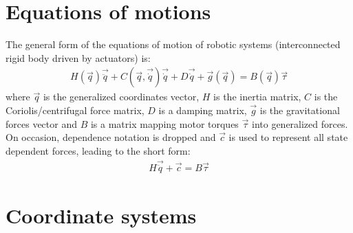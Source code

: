 \section{Equations of motions}
\label{sec:eom}

The general form of the equations of motion of robotic systems (interconnected rigid body driven by actuators) is:
%
\begin{align}
H(\vec{q}) \vec{\ddot{q}} + C(\vec{q},\vec{\dot{q}}) \vec{\dot{q}} + D \vec{\dot{q}} + \vec{g}(\vec{q}) = B(\vec{q}) \vec{\tau} 
\label{eq:manipulator}
\end{align}
%
where $\vec{q}$ is the generalized coordinates vector, $H$ is the inertia matrix, $C$ is the Coriolis/centrifugal force matrix, $D$ is a damping matrix, $\vec{g}$ is the gravitational forces vector and $B$ is a matrix mapping motor torques $\vec{\tau}$ into generalized forces.
On occasion, dependence notation is dropped and $\vec{c}$ is used to represent all state dependent forces, leading to the short form:
%
\begin{align}
H \vec{\ddot{q}} + \vec{c} = B \vec{\tau} 
\label{eq:manipulator_short}
\end{align}

\section{Coordinate systems}
\label{sec:coord}

